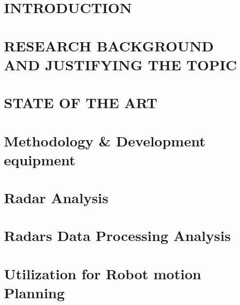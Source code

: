 \setlength{\headheight}{14.5pt}


\section*{INTRODUCTION}


\sloppypar
\raggedright 
\section{RESEARCH BACKGROUND AND JUSTIFYING THE TOPIC}



\sloppypar
\raggedright 
\section{STATE OF THE ART}



\sloppy
\section{Methodology \& Development equipment}



\sloppy
\section{Radar Analysis}
  


\sloppy
\section{Radars Data Processing Analysis}



\sloppy
\section{Utilization for Robot motion Planning}


